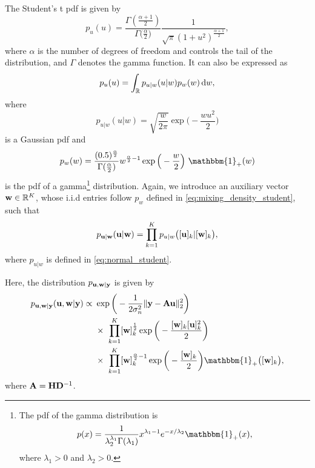 \documentclass[journal]{IEEEtran}
\begin{document}
The Student's t pdf is given by
\begin{equation}\label{eq:pdf_student}
    p_u(u) = \frac{\Gamma(\frac{\alpha+1}{2})}{\Gamma\big(\frac{\alpha}{2}\big)}\frac{1}{\sqrt{\pi}(1 + u^2)^{\frac{\alpha+1}{2}}},
\end{equation}
where $\alpha$ is the number of degrees of freedom and controls the tail of the distribution, and $\Gamma$ denotes the gamma function. It can also be expressed as
\begin{equation}
    p_u(u) = \int_{\mathbb{R}} p_{u|w}(u|w) p_w(w) \,\mathrm{d} w,
\end{equation}
where
\begin{equation}\label{eq:normal_student}
    p_{u|w}(u|w) = \sqrt{\frac{w}{2 \pi}} \exp\bigg(- \frac{w u^2}{2}\bigg)
\end{equation}
is a Gaussian pdf and
\begin{equation}\label{eq:mixing_density_student}
    p_w(w) = \frac{(0.5)^{\frac{\alpha}{2}}}{\Gamma(\frac{\alpha}{2})}w^{\frac{\alpha}{2}-1} \exp{\Big(-\frac{w}{2}\Big)} \ \mathbbm{1}_{+}(w)
\end{equation}
is the pdf of a gamma\footnote{The pdf of the gamma distribution is \begin{equation*} p(x) = \frac{1}{\lambda_2^{\lambda_1} \Gamma(\lambda_1)}x^{\lambda_1-1}e^{-x/\lambda_2} \mathbbm{1}_{+}(x), \end{equation*} where $\lambda_1 > 0$ and $\lambda_2 > 0$.} distribution. Again, we introduce an auxiliary vector ${\bf{w}} \in \mathbb{R}^K$, whose i.i.d entries follow $p_w$ defined in \eqref{eq:mixing_density_student}, such that
\begin{equation}\label{eq:aux_var_property_student}
    p_{{\bf{u}} | {\bf{w}}}({\bf{u}} | {\bf{w}}) = \prod_{k=1}^{K} p_{u|w}\big([{\bf{u}}]_k | [{\bf{w}}]_k\big),
\end{equation}
where $p_{u|w}$ is defined in \eqref{eq:normal_student}.

Here, the distribution $p_{{\bf{u}}, {\bf{w}} | {\bf{y}}}$ is given by
\begin{align}\label{eq:conditional_joint_distribution_student}
    p_{\M u, \M w | \M y}(\M u, \M w | \M y) \propto \ &\exp\bigg(-\frac{1}{2 \sigma_n^2} \|\M y - \M A \M u \|_{2}^{2}\bigg) \nonumber \\
    &\times \ \prod_{k=1}^{K}[\M w]_k^{\frac{1}{2}} \exp\bigg(-\frac{[\M w]_k [\M u]_k^2}{2}\bigg) \nonumber \\
    &\times \ \prod_{k=1}^{K} [\M w]_k^{\frac{\alpha}{2} - 1} \exp{\bigg(-\frac{[\M w]_k}{2}\bigg)} \mathbbm{1}_{+}\big([\M w]_k\big),
\end{align}
where ${\bf{A}} = {\bf{H}} {\bf{D}}^{-1}$.
\end{document}
